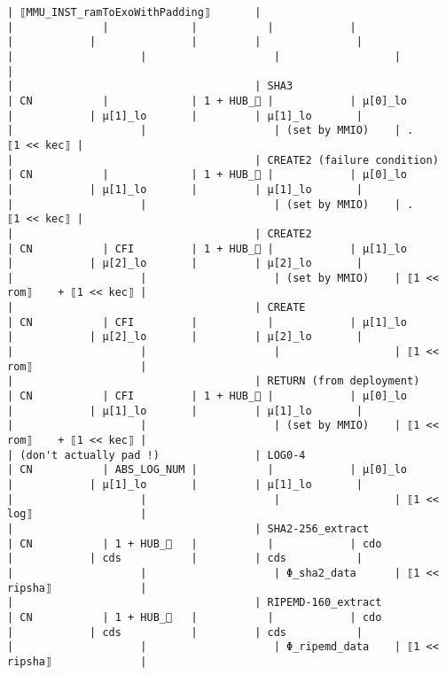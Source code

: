 \documentclass[varwidth=\maxdimen,margin=0.5cm,multi={verbatim}]{standalone}
\begin{document}
\begin{verbatim}
| ⟦MMU_INST_ramToExoWithPadding⟧       |                                  |              |             |           |            |                   |            |               |         |               |                        |                    |                    |                  |                            |
|                                      | SHA3                             | CN           |             | 1 + HUB_ |            | µ[0]_lo           |            | µ[1]_lo       |         | µ[1]_lo       |                        |                    |                    | (set by MMIO)    | .               ⟦1 << kec⟧ |
|                                      | CREATE2 (failure condition)      | CN           |             | 1 + HUB_ |            | µ[0]_lo           |            | µ[1]_lo       |         | µ[1]_lo       |                        |                    |                    | (set by MMIO)    | .               ⟦1 << kec⟧ |
|                                      | CREATE2                          | CN           | CFI         | 1 + HUB_ |            | µ[1]_lo           |            | µ[2]_lo       |         | µ[2]_lo       |                        |                    |                    | (set by MMIO)    | ⟦1 << rom⟧    + ⟦1 << kec⟧ |
|                                      | CREATE                           | CN           | CFI         |           |            | µ[1]_lo           |            | µ[2]_lo       |         | µ[2]_lo       |                        |                    |                    |                  | ⟦1 << rom⟧                 |
|                                      | RETURN (from deployment)         | CN           | CFI         | 1 + HUB_ |            | µ[0]_lo           |            | µ[1]_lo       |         | µ[1]_lo       |                        |                    |                    | (set by MMIO)    | ⟦1 << rom⟧    + ⟦1 << kec⟧ |
| (don't actually pad !)               | LOG0-4                           | CN           | ABS_LOG_NUM |           |            | µ[0]_lo           |            | µ[1]_lo       |         | µ[1]_lo       |                        |                    |                    |                  | ⟦1 << log⟧                 |
|                                      | SHA2-256_extract                 | CN           | 1 + HUB_   |           |            | cdo               |            | cds           |         | cds           |                        |                    |                    | Φ_sha2_data      | ⟦1 << ripsha⟧              |
|                                      | RIPEMD-160_extract               | CN           | 1 + HUB_   |           |            | cdo               |            | cds           |         | cds           |                        |                    |                    | Φ_ripemd_data    | ⟦1 << ripsha⟧              |

\end{verbatim}
\end{document}
